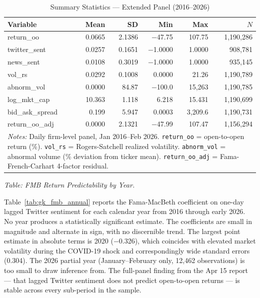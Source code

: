 \documentclass[12pt]{article}
\begin{document}
\begin{table}[htbp]
\centering
\caption{Summary Statistics --- Extended Panel (2016--2026)}
\label{tab:sumstats}
\begin{tabular}{lrrrrr}
\hline\hline
Variable & Mean & SD & Min & Max & $N$ \\
\hline
  return\_oo          & 0.0665  & 2.1386  & $-$47.75  & 107.75  & 1,190,286 \\
  twitter\_sent       & 0.0257  & 0.1651  & $-$1.0000 & 1.0000  & 908,781 \\
  news\_sent          & 0.0108  & 0.3019  & $-$1.0000 & 1.0000  & 935,145 \\
  vol\_rs             & 0.0292  & 0.1008  & 0.0000    & 21.26   & 1,190,789 \\
  abnorm\_vol         & 0.0000  & 84.87   & $-$100.0  & 15,263  & 1,190,785 \\
  log\_mkt\_cap       & 10.363  & 1.118   & 6.218     & 15.431  & 1,190,699 \\
  bid\_ask\_spread    & 0.199   & 5.947   & 0.0003    & 3,209.6 & 1,190,731 \\
  return\_oo\_adj     & 0.0000  & 2.1321  & $-$47.99  & 107.47  & 1,156,294 \\
\hline\hline
\multicolumn{6}{p{0.95\linewidth}}{\footnotesize \textit{Notes:} Daily firm-level panel, Jan 2016--Feb 2026.
\texttt{return\_oo} = open-to-open return (\%).
\texttt{vol\_rs} = Rogers-Satchell realized volatility.
\texttt{abnorm\_vol} = abnormal volume (\% deviation from ticker mean).
\texttt{return\_oo\_adj} = Fama-French-Carhart 4-factor residual.}
\end{tabular}
\end{table}

\medskip

\noindent\textit{Table: FMB Return Predictability by Year.}

Table~\ref{tab:gk_fmb_annual} reports the Fama-MacBeth coefficient on one-day lagged Twitter
sentiment for each calendar year from 2016 through early 2026. No year produces a statistically
significant estimate. The coefficients are small in magnitude and alternate in sign, with no
discernible trend. The largest point estimate in absolute terms is 2020 ($-$0.326), which
coincides with elevated market volatility during the COVID-19 shock and correspondingly wide
standard errors (0.304). The 2026 partial year (January--February only, 12,462 observations) is
too small to draw inference from. The full-panel finding from the Apr 15 report --- that lagged
Twitter sentiment does not predict open-to-open returns --- is stable across every sub-period in
the sample.
\end{document}
